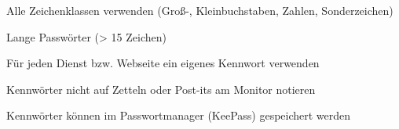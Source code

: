 \item Alle Zeichenklassen verwenden (Groß-, Kleinbuchstaben, Zahlen, Sonderzeichen)
\item Lange Passwörter (> 15 Zeichen)
\item Für jeden Dienst bzw. Webseite ein eigenes Kennwort verwenden
\item Kennwörter nicht auf Zetteln oder Post-its am Monitor notieren
\item Kennwörter können im Passwortmanager (KeePass) gespeichert werden